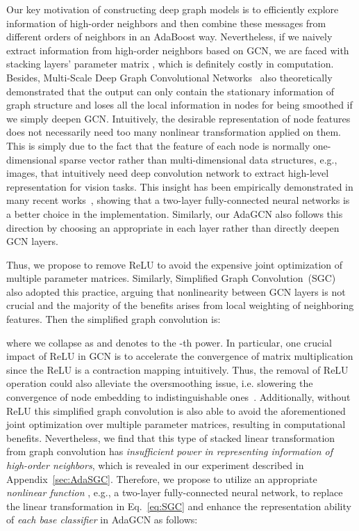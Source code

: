 \documentclass{article} \usepackage{iclr2021_conference,times}
\begin{document}
Our key motivation of constructing deep graph models is to efficiently explore information of high-order neighbors and then combine these messages from different orders of neighbors in an AdaBoost way. Nevertheless, if we naively extract information from high-order neighbors based on GCN, we are faced with stacking  layers' parameter matrix , which is definitely costly in computation. Besides, Multi-Scale Deep Graph Convolutional Networks~\citep{luan2019break} also theoretically demonstrated that the output can only contain the stationary information of graph structure and loses all the local information in nodes for being smoothed if we simply deepen GCN. Intuitively, the desirable representation of node features does not necessarily need too many nonlinear transformation  applied on them. This is simply due to the fact that the feature of each node is normally one-dimensional sparse vector rather than multi-dimensional data structures, e.g., images, that intuitively need deep convolution network to extract high-level representation for vision tasks. This insight has been empirically demonstrated in many recent works~\citep{wu2019simplifying, klicpera2018predict, xu2018powerful}, showing that a two-layer fully-connected neural networks is a better choice in the implementation. Similarly, our AdaGCN also follows this direction by choosing an appropriate  in each layer rather than directly deepen GCN layers.

Thus, we propose to remove ReLU to avoid the expensive joint optimization of multiple parameter matrices. Similarly, Simplified Graph Convolution~(SGC)~\citep{wu2019simplifying} also adopted this practice, arguing that nonlinearity between GCN layers is not crucial and the majority of the benefits arises from local weighting of neighboring features. Then the simplified graph convolution is:

where we collapse  as  and  denotes  to the -th power. In particular, one crucial impact of ReLU in GCN is to accelerate the convergence of matrix multiplication since the ReLU is a contraction mapping intuitively. Thus, the removal of ReLU operation could also alleviate the oversmoothing issue, i.e. slowering the convergence of node embedding to indistinguishable ones~\citep{li2018deeper}. Additionally, without ReLU this simplified graph convolution is also able to avoid the aforementioned joint optimization over multiple parameter matrices, resulting in computational benefits. Nevertheless, we find that this type of stacked linear transformation from graph convolution has \textit{insufficient power in representing information of high-order neighbors}, which is revealed in our experiment described in Appendix~\ref{sec:AdaSGC}. Therefore, we propose to utilize an appropriate \textit{nonlinear function} , e.g., a two-layer fully-connected neural network, to replace the linear transformation  in Eq.~\ref{eq:SGC} and enhance the representation ability of \textit{each base classifier} in AdaGCN as follows:
\end{document}
